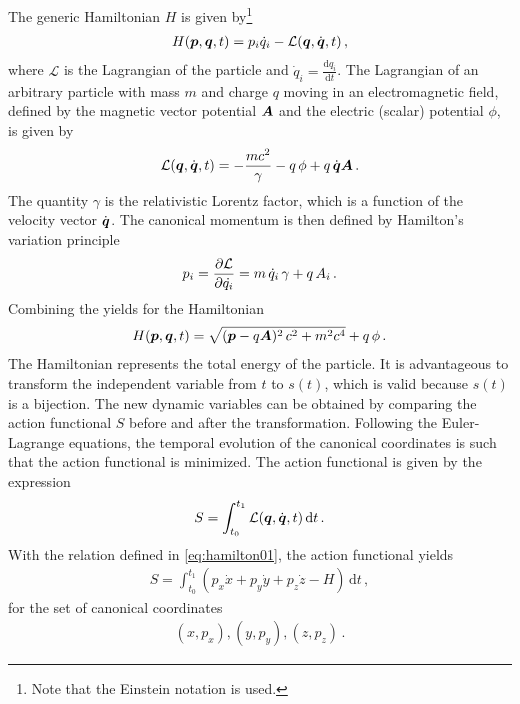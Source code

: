 The generic Hamiltonian $H$ is given by\footnote{Note that the Einstein notation is used.}~\cite{DESY-85-084}
%
\begin{align}
  H(\boldsymbol{p},\boldsymbol{q},t) = p_i \dot{q}_i - \mathcal{L}(\boldsymbol{q},\dot{\boldsymbol{q}},t) \, , \label{eq:hamilton01}
\end{align}
%
where $\mathcal{L}$ is the Lagrangian of the particle and $\dot{q}_i = \frac{\mathrm{d} q_i}{\mathrm{d} t}$. The Lagrangian of an arbitrary particle with mass $m$ and charge $q$ moving in an electromagnetic field, defined by the magnetic vector potential $\boldsymbol{A}$ and the electric (scalar) potential $\phi$, is given by
%
\begin{align}
  \mathcal{L}(\boldsymbol{q},\dot{\boldsymbol{q}},t) = - \frac{m c^2}{\gamma} - q \, \phi + q \, \dot{\boldsymbol{q}} \boldsymbol{A} \, . \label{eq:lagrangian01}
\end{align}
The quantity $\gamma$ is the relativistic Lorentz factor, which is a function of the velocity vector $\dot{\boldsymbol{q}}$. The canonical momentum is then defined by Hamilton's variation principle
%
\begin{align}
  p_i = \frac{\partial\mathcal{L}}{\partial\dot{q_i}} = m \, \dot{q}_i \,  \gamma + q \,  A_i \, .
\end{align}
%
Combining the  yields for the Hamiltonian
%
\begin{align}
  H(\boldsymbol{p},\boldsymbol{q},t) = \sqrt{(\boldsymbol{p}- q \boldsymbol{A})^2 \, c^2 + m^2c^4} + q \, \phi \, . \label{eq:h02}
\end{align}
%
The Hamiltonian represents the total energy of the particle. It is advantageous to transform the independent variable from $t$ to $s(t)$, which is valid because $s(t)$ is a bijection. The new dynamic variables can be obtained by comparing the action functional $S$ before and after the transformation. Following the Euler-Lagrange equations, the temporal evolution of the canonical coordinates is such that the action functional is minimized. The action functional is given by the expression
%
\begin{align}
  S= \int_{t_0}^{t_1} \mathcal{L}(\boldsymbol{q},\dot{\boldsymbol{q}}, t)\,  \mathrm{d}t \, .
\end{align}
%
With the relation defined in \eqref{eq:hamilton01}, the action functional yields
%
\begin{align}
  S = \int_{t_0}^{t_1} (p_x \dot{x} + p_y \dot{y} + p_z \dot{z} - H) \, \mathrm{d} t \, ,
\end{align}
for the set of canonical coordinates 
%
\begin{align}
  (x,p_x), (y,p_y), (z,p_z) \, .
\end{align}
